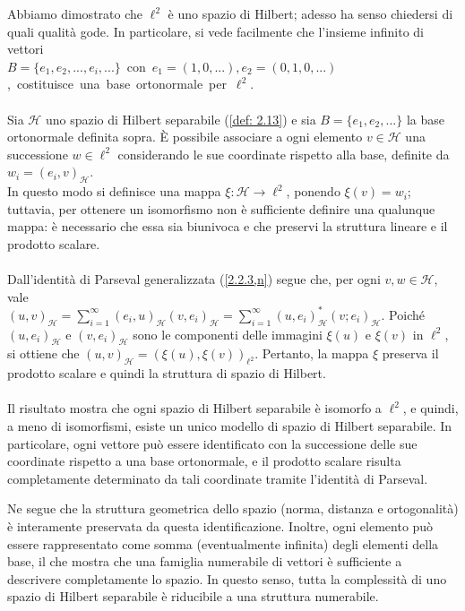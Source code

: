 \documentclass[a4paper,12pt]{report}
\begin{document}
Abbiamo dimostrato che $\ell^2$ è uno spazio di Hilbert; adesso ha senso chiedersi di quali qualità gode.
In particolare, si vede facilmente che l'insieme infinito di vettori 
\\\mbox{$B=\{e_1,e_2,...,e_i,...\}$ con $e_1=(1,0,...), e_2=(0,1,0,...)$, costituisce una base ortonormale per $\ell^2$}.
\\
\\Sia $\mathscr{H}$ uno spazio di Hilbert separabile (\ref{def: 2.13}) e sia $B=\{e_1,e_2,...\}$ la base ortonormale definita sopra. È possibile associare a ogni elemento $v \in \mathscr{H}$ una successione $w \in \ell^2$ considerando le sue coordinate rispetto alla base, definite da
$w_i = (e_i, v)_{\mathscr{H}}$.
\\In questo modo si definisce una mappa $\xi : \mathscr{H} \to \ell^2$, ponendo $\xi(v) = w_i$; tuttavia, per ottenere un isomorfismo non è sufficiente definire una qualunque mappa: è necessario che essa sia biunivoca e che preservi la struttura lineare e il prodotto scalare.
\\
\\Dall’identità di Parseval generalizzata (\ref{2.2.3,n}) segue che, per ogni $v, w \in \mathscr{H}$, vale
\\$(u,v)_\mathscr{H} = \displaystyle\sum_{i=1}^{\infty} (e_i,u)_{\mathscr{H}}(v, e_i)_{\mathscr{H}}=\sum_{i=1}^\infty(u,e_i)_{\mathscr{H}}^*(v;e_i)_\mathscr{H}$.
Poiché $(u, e_i)_\mathscr{H}$ e $(v, e_i)_\mathscr{H}$ sono le componenti delle immagini $\xi(u)$ e $\xi(v)$ in $\ell^2$, si ottiene che $
(u, v)_{\mathscr{H}}= ( \xi(u), \xi(v))_{\ell^2}$. Pertanto, la mappa $\xi$ preserva il prodotto scalare e quindi la struttura di spazio di Hilbert.
\\
\\Il risultato mostra che ogni spazio di Hilbert separabile è isomorfo a $\ell^2$, e quindi, a meno di isomorfismi, esiste un unico modello di spazio di Hilbert separabile. In particolare, ogni vettore può essere identificato con la successione delle sue coordinate rispetto a una base ortonormale, e il prodotto scalare risulta completamente determinato da tali coordinate tramite l’identità di Parseval.

Ne segue che la struttura geometrica dello spazio (norma, distanza e ortogonalità) è interamente preservata da questa identificazione. Inoltre, ogni elemento può essere rappresentato come somma (eventualmente infinita) degli elementi della base, il che mostra che una famiglia numerabile di vettori è sufficiente a descrivere completamente lo spazio. In questo senso, tutta la complessità di uno spazio di Hilbert separabile è riducibile a una struttura numerabile.
\end{document}
